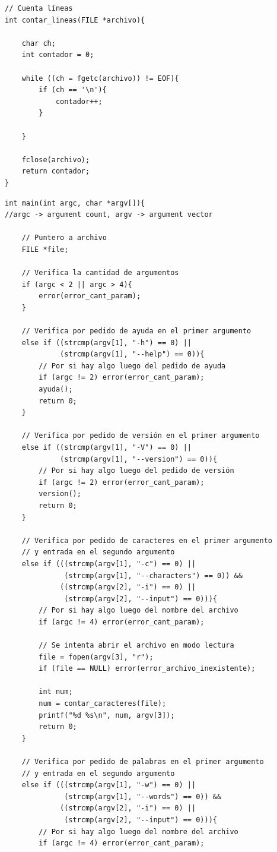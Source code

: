 \documentclass[a4paper, 10pt, twoside, notitlepage]{article}
\begin{document}
\begin{verbatim}
// Cuenta líneas
int contar_lineas(FILE *archivo){
    
    char ch;
    int contador = 0;

    while ((ch = fgetc(archivo)) != EOF){
        if (ch == '\n'){
            contador++;
        }

    }

    fclose(archivo);
    return contador;
}
\end{verbatim}
\newpage

\begin{verbatim}
int main(int argc, char *argv[]){
//argc -> argument count, argv -> argument vector

    // Puntero a archivo
    FILE *file;

    // Verifica la cantidad de argumentos
    if (argc < 2 || argc > 4){
        error(error_cant_param);
    }

    // Verifica por pedido de ayuda en el primer argumento
    else if ((strcmp(argv[1], "-h") == 0) || 
             (strcmp(argv[1], "--help") == 0)){
        // Por si hay algo luego del pedido de ayuda
        if (argc != 2) error(error_cant_param);
        ayuda();
        return 0;
    }

    // Verifica por pedido de versión en el primer argumento
    else if ((strcmp(argv[1], "-V") == 0) || 
             (strcmp(argv[1], "--version") == 0)){
        // Por si hay algo luego del pedido de versión
        if (argc != 2) error(error_cant_param);
        version();
        return 0;
    }

    // Verifica por pedido de caracteres en el primer argumento 
    // y entrada en el segundo argumento
    else if (((strcmp(argv[1], "-c") == 0) || 
              (strcmp(argv[1], "--characters") == 0)) && 
             ((strcmp(argv[2], "-i") == 0) || 
              (strcmp(argv[2], "--input") == 0))){
        // Por si hay algo luego del nombre del archivo
        if (argc != 4) error(error_cant_param);

        // Se intenta abrir el archivo en modo lectura
        file = fopen(argv[3], "r");
        if (file == NULL) error(error_archivo_inexistente);

        int num;
        num = contar_caracteres(file);
        printf("%d %s\n", num, argv[3]);
        return 0;
    }

    // Verifica por pedido de palabras en el primer argumento 
    // y entrada en el segundo argumento
    else if (((strcmp(argv[1], "-w") == 0) || 
              (strcmp(argv[1], "--words") == 0)) && 
             ((strcmp(argv[2], "-i") == 0) || 
              (strcmp(argv[2], "--input") == 0))){
        // Por si hay algo luego del nombre del archivo
        if (argc != 4) error(error_cant_param);


\end{verbatim}
\end{document}
